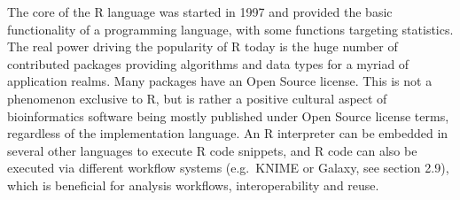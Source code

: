 \documentclass[]{article}
\begin{document}
The core of the R language was started in 1997 and provided the basic functionality of a programming language, with some functions targeting statistics. The real power driving the popularity of R today is the huge number of contributed packages providing algorithms and data types for a myriad of application realms. Many packages have an Open Source license. This is not a phenomenon exclusive to R, but is rather a positive cultural aspect of bioinformatics software being mostly published under Open Source license terms, regardless of the implementation language. An R interpreter can be embedded in several other languages to execute R code snippets, and R code can also be executed via different workflow systems (e.g.~KNIME or Galaxy, see section 2.9), which is beneficial for analysis workflows, interoperability and reuse.
\end{document}
